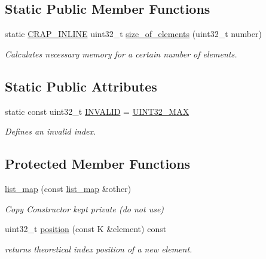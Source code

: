 \subsection*{Static Public Member Functions}
\begin{DoxyCompactItemize}
\item 
static \hyperlink{config__x86_8h_a5a40526b8d842e7ff731509998bb0f1c}{C\+R\+A\+P\+\_\+\+I\+N\+L\+I\+N\+E} uint32\+\_\+t \hyperlink{classcrap_1_1list__map_abf7e66c05dec61bb9898fbc5caff219d}{size\+\_\+of\+\_\+elements} (uint32\+\_\+t number)
\begin{DoxyCompactList}\small\item\em Calculates necessary memory for a certain number of elements. \end{DoxyCompactList}\end{DoxyCompactItemize}
\subsection*{Static Public Attributes}
\begin{DoxyCompactItemize}
\item 
static const uint32\+\_\+t \hyperlink{classcrap_1_1list__map_a313f6d46ae51b1bcd274860ee7e8c2a0}{I\+N\+V\+A\+L\+I\+D} = \hyperlink{crap__types_8h_ab5eb23180f7cc12b7d6c04a8ec067fdd}{U\+I\+N\+T32\+\_\+\+M\+A\+X}
\begin{DoxyCompactList}\small\item\em Defines an invalid index. \end{DoxyCompactList}\end{DoxyCompactItemize}
\subsection*{Protected Member Functions}
\begin{DoxyCompactItemize}
\item 
\hyperlink{classcrap_1_1list__map_a70f38690077b2bab1dc3e628b9faeeb8}{list\+\_\+map} (const \hyperlink{classcrap_1_1list__map}{list\+\_\+map} \&other)
\begin{DoxyCompactList}\small\item\em Copy Constructor kept private (do not use) \end{DoxyCompactList}\item 
uint32\+\_\+t \hyperlink{classcrap_1_1list__map_a90f82cdb028b5153e186e051cd5298e6}{position} (const K \&element) const 
\begin{DoxyCompactList}\small\item\em returns theoretical index position of a new element. \end{DoxyCompactList}\end{DoxyCompactItemize}
